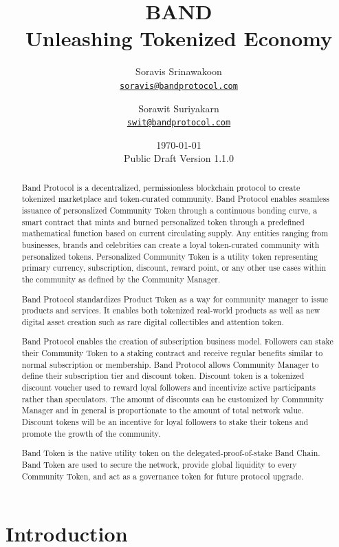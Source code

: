 \documentclass[letterpaper,11pt]{article}
\title{\LARGE BAND\\
    \Large Unleashing Tokenized Economy}
\author{
        Soravis Srinawakoon\\
        \small\href{mailto:soravis@bandprotocol.com}
            {\nolinkurl{soravis@bandprotocol.com}}
    \and
        Sorawit Suriyakarn\\
        \small\href{mailto:swit@bandprotocol.com}
            {\nolinkurl{swit@bandprotocol.com}}
    }
\date{\today\\\small Public Draft Version 1.1.0}
\begin{document}
\maketitle

\begin{abstract}

Band Protocol is a decentralized, permissionless blockchain protocol to create tokenized marketplace and token-curated community. Band Protocol enables seamless issuance of personalized Community Token through a continuous bonding curve, a smart contract that mints and burned personalized token through a predefined mathematical function based on current circulating supply. Any entities ranging from businesses, brands and celebrities can create a loyal token-curated community with personalized tokens. Personalized Community Token is a utility token representing primary currency, subscription, discount, reward point, or any other use cases within the community as defined by the Community Manager.

Band Protocol standardizes Product Token as a way for community manager to issue products and services. It enables both tokenized real-world products as well as new digital asset creation such as rare digital collectibles and attention token.

Band Protocol enables the creation of subscription business model. Followers can stake their Community Token to a staking contract and receive regular benefits similar to normal subscription or membership. Band Protocol allows Community Manager to define their subscription tier and discount token. Discount token is a tokenized discount voucher used to reward loyal followers and incentivize active participants rather than speculators. The amount of discounts can be customized by Community Manager and in general is proportionate to the amount of total network value. Discount tokens will be an incentive for loyal followers to stake their tokens and promote the growth of the community.

Band Token is the native utility token on the delegated-proof-of-stake Band Chain. Band Token are used to secure the network, provide global liquidity to every Community Token, and act as a governance token for future protocol upgrade.

\end{abstract}

\newpage
{
\hypersetup{linkcolor=black}
\tableofcontents
}
\newpage

\section{Introduction}
\end{document}
